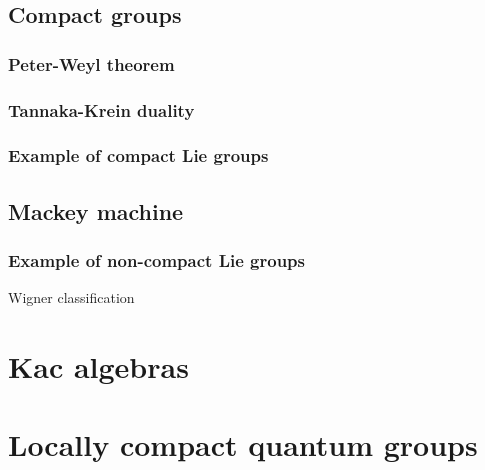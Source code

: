 \documentclass{../note}
\begin{document}
\chapter{Compact groups}
\section{Peter-Weyl theorem}
\section{Tannaka-Krein duality}
\section{Example of compact Lie groups}


\chapter{Mackey machine}
\section{Example of non-compact Lie groups}
Wigner classification








\part{Kac algebras}



\part{Locally compact quantum groups}
\end{document}

